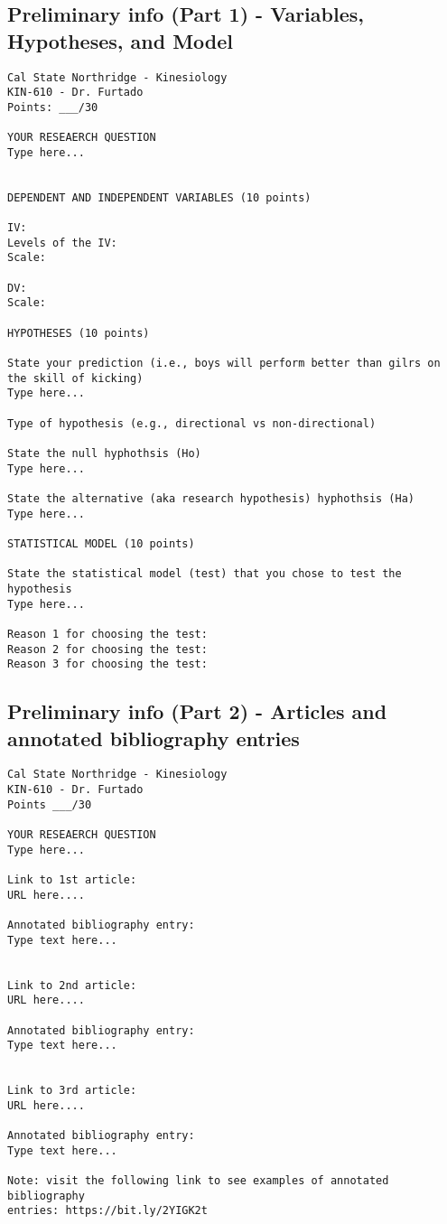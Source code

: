 \documentclass[
]{article}
\begin{document}
\hypertarget{preliminary-info-part-1---variables-hypotheses-and-model}{%
\subsection{Preliminary info (Part 1) - Variables, Hypotheses, and Model}\label{preliminary-info-part-1---variables-hypotheses-and-model}}

\begin{verbatim}
Cal State Northridge - Kinesiology
KIN-610 - Dr. Furtado
Points: ___/30

YOUR RESEAERCH QUESTION
Type here...


DEPENDENT AND INDEPENDENT VARIABLES (10 points)

IV: 
Levels of the IV:
Scale:

DV:
Scale:

HYPOTHESES (10 points)

State your prediction (i.e., boys will perform better than gilrs on the skill of kicking)
Type here...

Type of hypothesis (e.g., directional vs non-directional)

State the null hyphothsis (Ho)
Type here...

State the alternative (aka research hypothesis) hyphothsis (Ha)
Type here...

STATISTICAL MODEL (10 points)

State the statistical model (test) that you chose to test the hypothesis
Type here...

Reason 1 for choosing the test:
Reason 2 for choosing the test:
Reason 3 for choosing the test:
\end{verbatim}

\hypertarget{preliminary-info-part-2---articles-and-annotated-bibliography-entries}{%
\subsection{Preliminary info (Part 2) - Articles and annotated bibliography entries}\label{preliminary-info-part-2---articles-and-annotated-bibliography-entries}}

\begin{verbatim}
Cal State Northridge - Kinesiology
KIN-610 - Dr. Furtado
Points ___/30

YOUR RESEAERCH QUESTION
Type here...

Link to 1st article:
URL here....

Annotated bibliography entry:
Type text here...


Link to 2nd article:
URL here....

Annotated bibliography entry:
Type text here...


Link to 3rd article:
URL here....

Annotated bibliography entry:
Type text here...

Note: visit the following link to see examples of annotated bibliography
entries: https://bit.ly/2YIGK2t
\end{verbatim}
\end{document}

